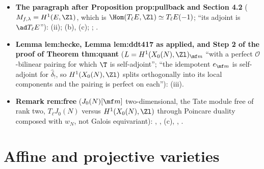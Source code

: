 \begin{itemize}
Hodge, (iii); unimodularity, ; step-by-step reading in .
\item \textbf{The paragraph after Proposition prop:pullback and Section 4.2} ($M_{f,\lambda}=H^1(E,\Zl)$, which is $\Hom(T_\ell E,\Zl)\simeq T_\ell E(-1)$; ``its adjoint is $\ad T_\ell E$''):
(ii);
(b), (c); ; .
\item \textbf{Lemma lem:hecke, Lemma lem:ddt417 as applied, and Step 2 of the proof of Theorem thm:quant} ($L=H^1(X_0(N),\Zl)_{\mf m}$ ``with a perfect $\mathcal O$-bilinear pairing for which $\T$ is
self-adjoint''; ``the idempotent $e_{\mf m}$ is self-adjoint for $\hat\delta_!$, so $H^1(X_0(N),\Zl)$ splits orthogonally into its local components and the pairing is perfect on each''):
(iii).
\item \textbf{Remark rem:free} ($J_0(N)[\mf m]$ two-dimensional, the Tate module free of rank two, $T_\ell J_0(N)$ versus $H^1(X_0(N),\Zl)$ through Poincare duality composed with $w_N$, not Galois
equivariant): , , (c), , .
\end{itemize}
\section{Affine and projective varieties}\label{sec:curves:varieties}

